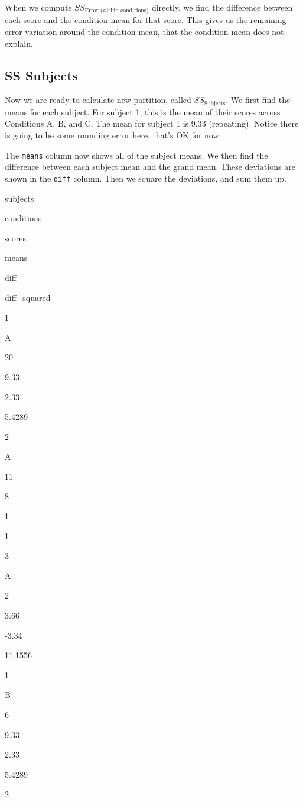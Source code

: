 \documentclass[]{book}
\begin{document}
When we compute \(SS_\text{Error (within conditions)}\) directly, we find the difference between each score and the condition mean for that score. This gives us the remaining error variation around the condition mean, that the condition mean does not explain.

\hypertarget{ss-subjects}{%
\subsection{SS Subjects}\label{ss-subjects}}

Now we are ready to calculate new partition, called \(SS_\text{Subjects}\). We first find the means for each subject. For subject 1, this is the mean of their scores across Conditions A, B, and C. The mean for subject 1 is 9.33 (repeating). Notice there is going to be some rounding error here, that's OK for now.

The \texttt{means} column now shows all of the subject means. We then find the difference between each subject mean and the grand mean. These deviations are shown in the \texttt{diff} column. Then we square the deviations, and sum them up.

subjects

conditions

scores

means

diff

diff\_squared

1

A

20

9.33

2.33

5.4289

2

A

11

8

1

1

3

A

2

3.66

-3.34

11.1556

1

B

6

9.33

2.33

5.4289

2
\end{document}
